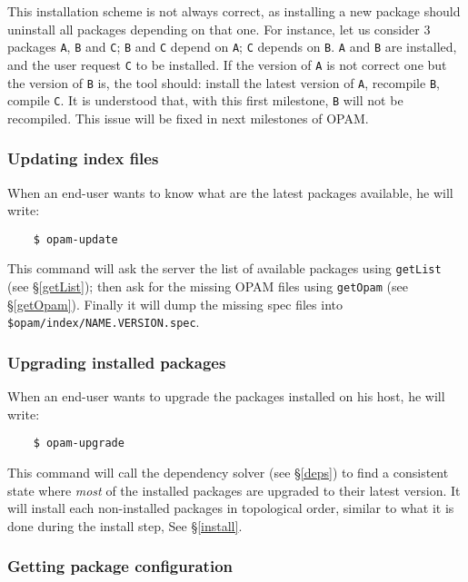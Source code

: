 \documentclass[a4paper,11pt]{article}
\newenvironment{remark}[1][Remark]{\begin{trivlist}
\item[\hskip \labelsep {\bfseries #1}]}{\end{trivlist}}
\begin{document}
\begin{remark}
This installation scheme is not always correct, as installing a new
package should uninstall all packages depending on that one. For
instance, let us consider 3 packages {\tt A}, {\tt B} and {\tt C};
{\tt B} and {\tt C} depend on {\tt A}; {\tt C} depends on {\tt B}.
{\tt A} and {\tt B} are installed, and the user request {\tt C} to be
installed. If the version of {\tt A} is not correct one but the
version of {\tt B} is, the tool should: install the latest version of
{\tt A}, recompile {\tt B}, compile {\tt C}. It is understood that,
with this first milestone, {\tt B} will not be recompiled. This issue
will be fixed in next milestones of OPAM.
\end{remark}

\subsubsection{Updating index files}

When an end-user wants to know what are the latest packages available,
he will write:

\begin{verbatim}
    $ opam-update
\end{verbatim}

This command will ask the server the list of available packages using
{\tt getList} (see \S\ref{getList}); then ask for the missing OPAM
files using {\tt getOpam} (see \S\ref{getOpam}). Finally it will dump
the missing spec files into {\tt \$opam/index/NAME.VERSION.spec}.

\subsubsection{Upgrading installed packages}

When an end-user wants to upgrade the packages installed on his host,
he will write:

\begin{verbatim}
    $ opam-upgrade
\end{verbatim}

This command will call the dependency solver (see \S\ref{deps}) to
find a consistent state where {\em most} of the installed packages are
upgraded to their latest version. It will install each non-installed
packages in topological order, similar to what it is done during the
install step, See \S\ref{install}.

\subsubsection{Getting package configuration}
\end{document}
